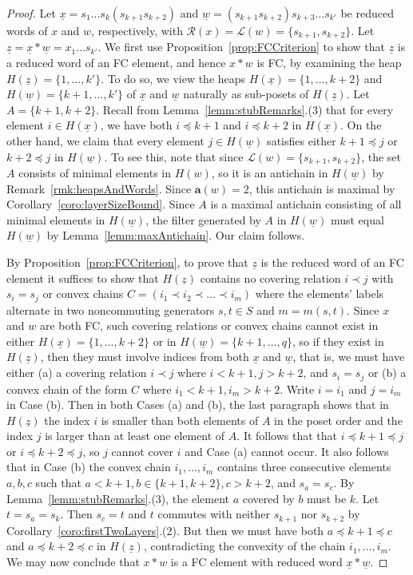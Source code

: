 \documentclass[ALCO,Unicode,published]{cedram}
\newcommand{\call}{\mathcal{L}}
\newcommand{\calr}{\mathcal{R}}
\newcommand{\la}{\mathbf{a}}
\newcommand{\ul}{\underline}
\begin{document}
\begin{proof}
    Let $\ul x= s_1\dots s_k(s_{k+1}s_{k+2})$ and $\ul w=(s_{k+1}s_{k+2})s_{k+3}\dots s_{k'}$ be
    reduced words of $x$ and $w$, respectively, with $\calr(x)=\call(w)=\{s_{k+1},s_{k+2}\}$. Let
    $\ul z=\ul x*\ul w=x_1\dots s_{k'}$. We first use Proposition~\ref{prop:FCCriterion} to show that $\ul z$
    is a reduced word of an FC element, and hence $x*w$ is FC, by examining the heap $H(\ul
    z)=\{1,\dots,k'\}$. To do so, we view the heaps $H(\ul x)=\{1,\dots, k+2\}$ and $H(\ul
    w)=\{k+1,\dots, k'\}$ of $\ul x$ and $\ul w$ naturally as sub-posets of $H(\ul z)$. Let
    $A=\{k+1,k+2\}$. Recall from Lemma~\ref{lemm:stubRemarks}.(3) that for every element $i\in H(\ul x)$,
    we have both $i\preceq k+1$ and $i\preceq k+2$ in $H(\ul x)$. On the other hand, we claim that
    every element $j\in H(\ul w)$ satisfies either $k+1\preceq j$ or $k+2 \preceq j$ in $H(\ul w)$.
    To see this, note that since $\call(w)=\{s_{k+1},s_{k+2}\}$, the set $A$ consists of minimal
    elements in $H(w)$, so it is an antichain in $H(\ul w)$ by Remark~\ref{rmk:heapsAndWords}. Since
    $\la(w)=2$, this antichain is maximal by Corollary~\ref{coro:layerSizeBound}. Since $A$ is a maximal
    antichain consisting of all minimal elements in $H(\ul w)$, the filter generated by $A$ in
    $H(\ul w)$ must equal $H(\ul w)$ by Lemma~\ref{lemm:maxAntichain}. Our claim follows.

    By Proposition~\ref{prop:FCCriterion}, to prove that $\ul z$ is the reduced word of an FC element it
    suffices to show that $H(\ul z)$ contains no covering relation $i\prec j$ with $s_i=s_j$ or
    convex chains $C=(i_1\prec i_2\prec \dots \prec i_m)$ where the elements' labels alternate in
    two noncommuting generators $s,t\in S$ and $m=m(s,t)$.  Since $x$ and $w$ are both FC, such
    covering relations or convex chains cannot exist in either $H(\ul x)=\{1,\dots, k+2\}$ or in $H(\ul
    w)=\{k+1,\dots,q\}$, so if they exist in $H(\ul z)$, then they must involve indices from both
    $\ul x$ and $\ul w$, that is, we must have either (a) a covering relation $i\prec j$ where
    $i<k+1, j>k+2$, and $s_i=s_j$ or (b) a convex chain of the form $C$ where $i_1<k+1,i_m>k+2$.
    Write $i=i_1$ and $j=i_m$ in Case (b).  Then in both Cases (a) and (b), the last paragraph shows
    that in $H(\ul z)$ the index $i$ is smaller than both elements of $A$ in the poset order and the
    index $j$ is larger than at least one element of $A$. It follows that that $i\preceq k+1\preceq
    j$ or $i\preceq k+2\preceq j$, so $j$ cannot cover $i$ and Case (a) cannot occur. It also
    follows that in Case (b) the convex chain $i_1,\dots, i_m$ contains three consecutive elements
    $a, b, c$ such that $a<k+1,b\in \{k+1,k+2\}, c>k+2$, and $s_a=s_c$. By
    Lemma~\ref{lemm:stubRemarks}.(3), the element $a$ covered by $b$ must be $k$. Let $t=s_a=s_k$. Then
    $s_c=t$ and $t$ commutes with neither $s_{k+1}$ nor $s_{k+2}$ by Corollary~\ref{coro:firstTwoLayers}.(2).
    But then we must have both $a\preceq k+1\preceq c$ and $a\preceq k+2\preceq c$ in $H(\ul z)$,
    contradicting the convexity of the chain $i_1,\dots, i_m$. We may now conclude that $x*w$ is a
    FC element with reduced word $\ul x*\ul w$. 


\end{proof}
\end{document}
